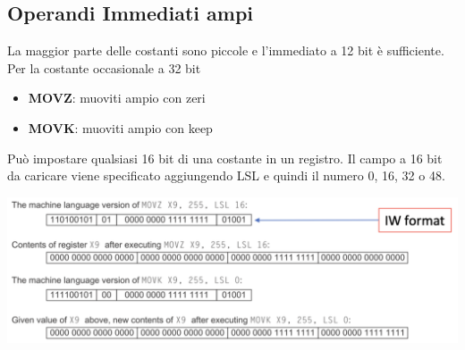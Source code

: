 \documentclass[12pt,a4paper]{article}
\begin{document}
\subsection{Operandi Immediati ampi}
La maggior parte delle costanti sono piccole e l'immediato a 12 bit è sufficiente.\\
Per la costante occasionale a 32 bit
\begin{itemize}
\item \textbf{MOVZ}: muoviti ampio con zeri
\item \textbf{MOVK}: muoviti ampio con keep
\end{itemize}
Può impostare qualsiasi 16 bit di una costante in un registro. Il campo a 16 bit da caricare viene specificato aggiungendo LSL e quindi il numero 0, 16, 32 o 48.
\begin{center}
\includegraphics[width=0.7\columnwidth]{img/mov.png}
\end{center}
\end{document}
